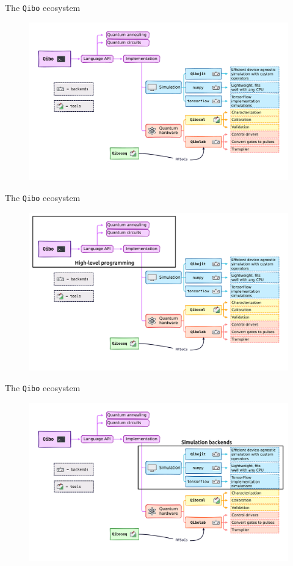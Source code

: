 \documentclass[8pt, xcolor={svgnames}, hyperref={linkcolor=black}]{beamer}
\begin{document}
\begin{frame}{The \texttt{Qibo} ecosystem}
\begin{figure}  
   \includegraphics[width=1\textwidth]{figures/qibo_ecosystem.pdf}
\end{figure}
\end{frame}

\begin{frame}{The \texttt{Qibo} ecosystem}
\begin{figure}  
   \includegraphics[width=1\textwidth]{figures/eco1.png}
\end{figure}
\end{frame}

\begin{frame}{The \texttt{Qibo} ecosystem}
\begin{figure}  
   \includegraphics[width=1\textwidth]{figures/eco2.png}
\end{figure}
\end{frame}
\end{document}
